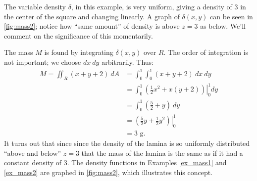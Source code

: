 {The variable density $\delta$, in this example, is very uniform, giving a density of 3 in the center of the square and changing linearly. A graph of $\delta(x,y)$ can be seen in \autoref{fig:mass2}; notice how ``same amount'' of density is above $z=3$ as below. We'll comment on the significance of this momentarily.

The mass $M$ is found by integrating $\delta(x,y)$ over $R$. The order of integration is not important; we choose $dx\ dy$ arbitrarily. Thus:
\begin{align*}
M = \iint_R(x+y+2)\ dA &= \int_0^1\int_0^1 (x+y+2)\ dx\ dy\\
		&= \int_0^1\left.\left(\frac 12x^2+x(y+2)\right)\right|_0^1dy\\
		&= \int_0^1 \left(\frac52+y\right)\ dy\\
		&= \left.\left(\frac52y+\frac12y^2\right)\right|_0^1\\
		&= 3\text{ g}.
\end{align*}
It turns out that since since the density of the lamina is so uniformly distributed ``above and below'' $z=3$ that the mass of the lamina is the same as if it had a constant density of 3. The density functions in Examples \ref{ex_mass1} and \ref{ex_mass2} are graphed in \autoref{fig:mass2}, which illustrates this concept.}

